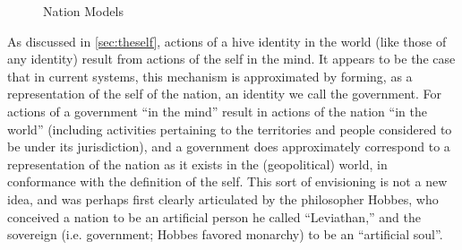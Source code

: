 \documentclass[pra,twocolumn,groupedaddress,10pt]{revtex4}
\theoremstyle{definition}
\begin{document}
\begin{figure}[htp]
\caption{\label{fig:nation}Nation Models}
\end{figure}

As discussed in \autoref{sec:theself}, actions of a hive identity in the world (like those of any identity) result from actions of the self in the mind. It appears to be the case that in current systems, this mechanism is approximated by forming, as a representation of the self of the nation, an identity we call the government. For actions of a government ``in the mind'' result in actions of the nation ``in the world'' (including activities pertaining to the territories and people considered to be under its jurisdiction), and a government does approximately correspond to a representation of the nation as it exists in the (geopolitical) world, in conformance with the definition of the self. This sort of envisioning is not a new idea, and was perhaps first clearly articulated by the philosopher Hobbes, who conceived a nation to be an artificial person he called ``Leviathan,''\cite{hobbes} and the sovereign (i.e. government; Hobbes favored monarchy) to be an ``artificial soul''\cite{russell}.
\end{document}
